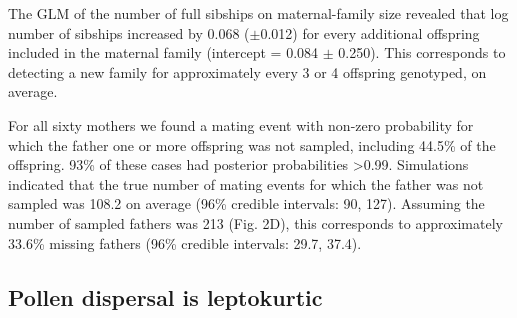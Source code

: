 \documentclass[10pt, a4paper, twocolumn]{article} %
\begin{document}
The GLM of the number of full sibships on maternal-family size revealed that log number of sibships increased by 0.068 ($\pm$0.012) for every additional offspring included in the maternal family (intercept = 0.084 $\pm$ 0.250). This corresponds to detecting a new family for approximately every 3 or 4 offspring genotyped, on average.

For all sixty mothers we found a mating event with non-zero probability for which the father one or more offspring was not sampled, including 44.5\% of the offspring. 93\% of these cases had posterior probabilities >0.99. Simulations indicated that the true number of mating events for which the father was not sampled was 108.2 on average (96\% credible intervals: 90, 127). Assuming the number of sampled fathers was 213 (Fig. 2D), this corresponds to approximately 33.6\% missing fathers (96\% credible intervals: 29.7, 37.4).

\subsection{Pollen dispersal is leptokurtic}
\end{document}
